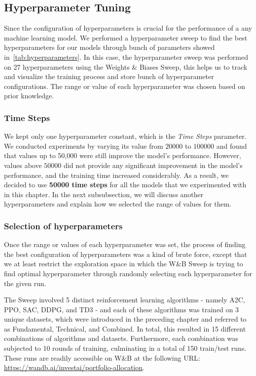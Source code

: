 \documentclass[../xlapes02]{subfiles}
\begin{document}
    \subsection{Hyperparameter Tuning}\label{subsec:hyperparameters_tuning}
    Since the configuration of hyperparameters is crucial for the performance of a any machine learning model. We performed a hyperparameter sweep to find the best hyperparameters for our models through bunch of parameters showed in~\cref{tab:hyperparameters}. In this case, the hyperparameter sweep was performed on 27 hyperparameters using the Weights \& Biases Sweep, this helps us to track and visualize the training process and store bunch of hyperparameter configurations. The range or value of each hyperparameter was chosen based on prior knowledge.

    \subsubsection{Time Steps}\label{subsubsec:time_steps}
    We kept only one hyperparameter constant, which is the \emph{Time Steps} parameter. We conducted experiments by varying its value from $20000$ to $100000$ and found that values up to 50,000 were still improve the model's performance. However, values above $50000$ did not provide any significant improvement in the model's performance, and the training time increased considerably. As a result, we decided to use \textbf{50000 time steps} for all the models that we experimented with in this chapter. In the next subsubsection, we will discuss another hyperparameters and explain how we selected the range of values for them.

    \subsubsection{Selection of hyperparameters}\label{subsubsec:selection_of_hyperparameters}
    Once the range or values of each hyperparameter was set, the process of finding the best configuration of hyperparameters was a kind of brute force, except that we at least restrict the exploration space in which the W\&B Sweep is trying to find optimal hyperparameter through randomly selecting each hyperparameter for the given run.

    The Sweep involved 5 distinct reinforcement learning algorithms - namely A2C, PPO, SAC, DDPG, and TD3 - and each of these algorithms was trained on 3 unique datasets, which were introduced in the preceding chapter and referred to as Fundamental, Technical, and Combined. In total, this resulted in 15 different combinations of algorithms and datasets. Furthermore, each combination was subjected to 10 rounds of training, culminating in a total of 150 train/test runs. These runs are readily accessible on W\&B at the following URL: \url{https://wandb.ai/investai/portfolio-allocation}.
\end{document}
